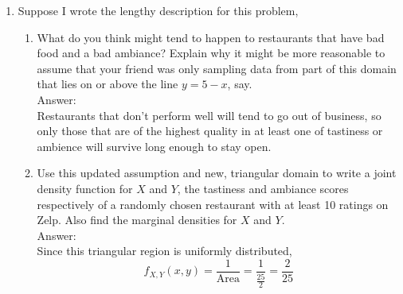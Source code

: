 \documentclass{article}
\begin{document}
\begin{enumerate}
        Letting $X$ = \# people on the elevator, and $Y$ = \# stops, then the expected number of stops is given by
        $$E[Y] = \sum^{\infty}_{n=0}E[Y|X=n]\cdot P(X=n)$$
        where $P(X=n) = e^{-5} \frac{5^n}{n!}$, and $E[Y|X=n] = \sum^{10}_{1} 1 - \left(\frac{9}{10}\right)^n = 10(1-\frac{9}{10}^n)$.
        Then, multiplying the two and separating the sums,
        $$\sum^{\infty}_{n=0} 10 e^{-5} \frac{5^n}{n!} - \left(\sum^{\infty}_{n=0}10\left(\frac{9}{10}\right)^n e^{-5} \frac{5^n}{n!}\right)$$
        The first sum then sums to 10 $\times$ 1, since the sum is over the poisson which equals 1. The second sum has a similar
        result, by rearranging to be
        $$ \sum^{\infty}_{n=0} 10 e^{-5} \left(\frac{9\times5}{10}\right)^n \cdot \frac{1}{n!}=10e^{-5}\sum^{\infty}_{n=0}\left(\frac{9\times5}{10}\right)^n \cdot \frac{1}{n!}$$
        Which then follows the pattern for $e^{\lambda}$, where
        $$\sum^{\infty}_{n=0}\frac{\lambda^n}{n!}=e^{\lambda} \Rightarrow \sum^{\infty}_{n=0}\left(\frac{45}{10}\right)^n \cdot \frac{1}{n!} = e^{4.5}$$
        Resulting in
        $$ 10 - 10e^{4.5-5} = 10 - \frac{10}{\sqrt{e}} \approx 3.9347$$
    \clearpage
    \item   Suppose I wrote the lengthy description for this problem,
        \begin{enumerate}
            \item   What do you think might tend to happen to restaurants that have bad food and a bad ambiance?
                    Explain why it might be more reasonable to assume that your friend was only sampling data from 
                    part of this domain that lies on or above the line $y=5-x$, say.
                \\Answer:\\
                Restaurants that don't perform well will tend to go out of business, so only those that are of the highest
                quality in at least one of tastiness or ambience will survive long enough to stay open.
            \item   Use this updated assumption and new, triangular domain to write a joint density function for 
                    $X$ and $Y$, the tastiness and ambiance scores respectively of a randomly chosen restaurant with
                    at least 10 ratings on Zelp. Also find the marginal densities for $X$ and $Y$.
                \\Answer:\\
                Since this triangular region is uniformly distributed,
                $$f_{X,Y}(x,y) = \frac{1}{\text{Area}} = \frac{1}{\frac{25}{2}} = \frac{2}{25} $$

\end{enumerate}
\end{enumerate}
\end{document}
